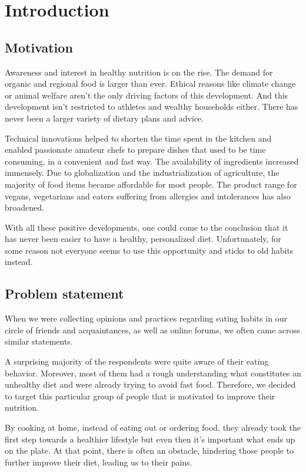 \chapter{Introduction}
\section{Motivation}
Awareness and interest in healthy nutrition is on the rise. The demand for organic and regional food is larger than ever. Ethical reasons like climate change or animal welfare aren’t the only driving factors of this development. And this development isn’t restricted to athletes and wealthy households either. There has never been a larger variety of dietary plans and advice. 

Technical innovations helped to shorten the time spent in the kitchen and enabled passionate amateur chefs to prepare dishes that used to be time consuming, in a convenient and fast way. The availability of ingredients increased immensely. Due to globalization and the industrialization of agriculture, the majority of food items became affordable for most people. The product range for vegans, vegetarians and eaters suffering from allergies and intolerances has also broadened. 

With all these positive developments, one could come to the conclusion that it has never been easier to have a healthy, personalized diet. Unfortunately, for some reason not everyone seems to use this opportunity and sticks to old habits instead.
\section{Problem statement}
When we were collecting opinions and practices regarding eating habits in our circle of friends and acquaintances, as well as online forums, we often came across similar statements. 

A surprising majority of the respondents were quite aware of their eating behavior. Moreover, most of them had a rough understanding what constitutes an unhealthy diet and were already trying to avoid fast food. Therefore, we decided to target this particular group of people that is motivated to improve their nutrition. 

By cooking at home, instead of eating out or ordering food, they already took the first step towards a healthier lifestyle but even then it’s important what ends up on the plate. At that point, there is often an obstacle, hindering those people to further improve their diet, leading us to their pains.

